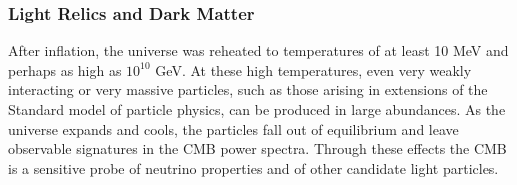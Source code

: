 %
\vspace{-0.15in}

\subsubsection{Light Relics and Dark Matter}

\vspace{-0.05in}

After inflation, the universe was reheated to temperatures of at least 10 MeV and perhaps as high as $10^{10}$ GeV.  
At these high temperatures, even very weakly interacting or very massive particles, such as those arising 
in extensions of the Standard model of particle physics, can be produced in large abundances.  As the universe expands and cools, 
the particles fall out of equilibrium and leave observable signatures in the \ac{CMB} power spectra. 
Through these effects the CMB is a sensitive probe of neutrino properties and of other 
candidate light particles.  

